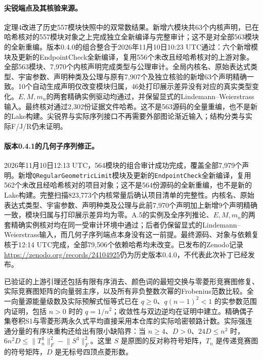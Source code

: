 \documentclass[UTF8,11pt,fontset=fandol]{ctexart}
\begin{document}
\paragraph{尖锐端点及其核验来源。} 定理4改进了历史557模块快照中的双常数结果。新增六模块共63个内核声明，已在哈希核对的557模块对象之上完成独立全新编译与完整审计；这不是对全部563模块的全新重编。版本0.4.0的组合整合于2026年11月10日10:23 UTC通过：六个新增模块及更新的EndpointCheck全新编译，复用556个未改且经哈希核对的上游对象。全部563模块、7,970个内核声明完成类型与公理审计。全局内核名、原始表达式类型、宇宙参数、声明种类及公理与原有7,907个及独立核验的新增63个声明精确一致。10个自动生成声明仅改变模块归属，46处打印展示差异没有对应的真实类型变化。$E,M,m_n$的两套精确实例驱动均通过，并保留显式的Lindemann--Weierstrass输入。最终核对通过2,302份证据文件哈希。这不是563源码的全量重编，也不是新的Lake构建。尖锐界与实际序列接口不再需要外部图论渐近输入；结构分类与实际F/J/R仍未证明。

\paragraph{版本0.4.1的几何子序列修正。} 2026年11月10日12:13 UTC，564模块的组合审计成功完成，覆盖全部7,979个声明。新增\texttt{QRegularGeometricLimit}模块及更新的\texttt{EndpointCheck}全新编译，复用562个未改且经哈希核对的项目对象；这不是564份源码的全新重编，也不是新的Lake构建。完整扫描823,773个内核常量后确认项目清单的完整性。内核名、原始表达式类型、宇宙参数、声明种类及公理与此前7,970个声明加上新增9个声明精确一致，模块归属与打印展示差异均为零。A.5的实例及全序列推论、$E,M,m_n$的两套精确实例核对均在同一受审计环境中通过；后者仍保留显式的Lindemann--Weierstrass输入，而几何子序列端点本身没有这一前提。最终源码、对象与依赖复核于12:14 UTC完成，全部79,506个依赖哈希均未改变。已发布的Zenodo记录\url{https://zenodo.org/records/24104925}仍为历史版本0.4.0，不代表此次补丁已经发布。

已验证的上游引理还包括有限有序消去、颜色词的最短交换与零菱形竞赛图修复、实际竞赛图矩阵的向量弱主序，以及所有非负整数次幂的Frobenius范数比较。全一向量源能量级数及实际预解式恒等式已在 $q\ge0$、$q(n-1)^2<1$ 的实参数范围内证明，包括 $n>0$ 时的 $q=1/n^2$；收敛性与双边逆均在证明中建立。精确偶子集卷积S1与零菱形两永久式平均直接采用本仓库的实际哈密顿路计数。实际强连通分量的有序块重构还给出有限小缺陷界：当 $n\ge4$、$D>0$、$24D\le n^2$ 时，$6n^2D\le\lVert T_n^3\rVert_F^2-\lVert S^3\rVert_F^2$。这里 $S$ 是原图的反对称符号矩阵，$T_n$ 是传递竞赛图的符号矩阵，$D$ 是无标号四顶点菱形数。
\end{document}

